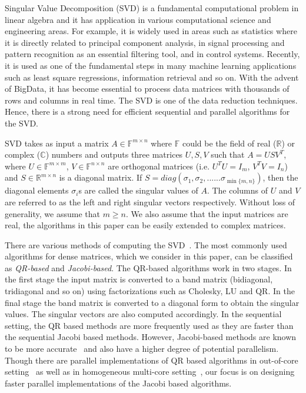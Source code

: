 \documentclass[10pt, conference, compsocconf]{IEEEtran}
\begin{document}
Singular Value Decomposition (SVD) is a fundamental computational problem in linear algebra and it has application in various computational science and engineering areas. For example, it is widely used in areas such as statistics where it is directly related to principal component analysis, in signal processing and pattern recognition as an essential filtering tool, and in control systems. Recently, it is used as one of the fundamental steps in many machine learning applications such as least square regressions, information retrieval and so on. With the advent of BigData, it has become essential to process data matrices with thousands of rows and columns in real time. The SVD is one of the data reduction techniques. Hence, there is a strong need for efficient sequential and parallel algorithms for the SVD.

SVD takes as input a matrix $A \in \mathbb{F}^{m \times n}$ where $\mathbb{F}$ could be the field of real ($\mathbb{R}$) or complex ($\mathbb{C}$) numbers and outputs three matrices $U, S, V$ such that $A = USV^T$, where $U \in \mathbb{F}^{m \times m}$, $V \in \mathbb{F}^{n \times n}$ are orthogonal matrices (i.e. $U^TU = I_m$, $V^TV = I_n$) and $S \in \mathbb{R}^{m \times n}$ is a diagonal matrix. If $S = diag(\sigma_1, \sigma_2,......\sigma_{\min\{m,n\}})$, then the diagonal elements $\sigma_i$s are called the singular values of $A$. The columns of $U$ and $V$ are referred to as the left and right singular vectors respectively. Without loss of generality, we assume that $m \ge n$. We also assume that the input matrices are real, the algorithms in this paper can be easily extended to complex matrices. 

There are various methods of computing the SVD~\cite{golub2012matrix}. The most commonly used algorithms for dense matrices, which we consider in this paper, can be classified as \emph{QR-based} and \emph{Jacobi-based}. The QR-based algorithms work in two stages. In the first stage the input matrix is converted to a band matrix (bidiagonal, tridiagonal and so on) using factorizations such as Cholesky, LU and QR. In the final stage the band matrix is converted to a diagonal form to obtain the singular values. The singular vectors are also computed accordingly. In the sequential setting, the QR based methods are more frequently used as they are faster than the sequential Jacobi based methods. However, Jacobi-based methods are known to be more accurate~\cite{demmel1992jacobi} and also have a higher degree of potential parallelism. Though there are parallel implementations of QR based algorithms in out-of-core setting~\cite{grimes1987solution, grimes1988solution} as well as in homogeneous multi-core setting~\cite{haidar2013improved}, our focus is on designing faster parallel implementations of the Jacobi based algorithms.
\end{document}
